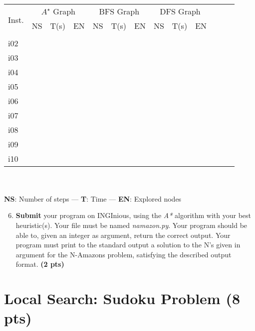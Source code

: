 \documentclass[11pt,a4paper]{report}
\begin{document}
~ 

\begin{answers}[6.5cm]
\begin{center}
\begin{tabular}{||l||l|l|l||l|l|l||l|l|l||l|l|l||}
\hline
\multirow{3}{*}{Inst.} & \multicolumn{3}{c||}{$A^{\star}$ Graph}& \multicolumn{3}{c||}{BFS Graph} & \multicolumn{3}{c||}{DFS Graph}\\
 & NS & T(s) & EN & NS & T(s) & EN & NS & T(s) & EN\\
\hline
i01 & & & & & & & & & \\
\hline
i02 & & & & & & & & & \\
\hline
i03 & & & & & & & & & \\
\hline
i04 & & & & & & & & & \\
\hline
i05 & & & & & & & & & \\
\hline
i06 & & & & & & & & & \\
\hline
i07 & & & & & & & & & \\
\hline
i08 & & & & & & & & & \\
\hline
i09 & & & & & & & & & \\
\hline
i10 & & & & & & & & & \\
\hline
\end{tabular}\\

~\\
\textbf{NS}: Number of steps — \textbf{T}: Time — \textbf{EN}: Explored nodes
\end{center}
\end{answers}



\begin{enumerate}
\setcounter{enumi}{5}
\item \textbf{Submit} your program on INGInious, using the \textit{A*} algorithm with your best heuristic(s).
		 Your file must be named \emph{namazon.py}. 
      Your program should be able to, given an integer as argument, return the correct output.
		 Your program must print to the standard output a solution to the N's given in argument for the N-Amazons problem, satisfying the described output format. \textbf{(2 pts)}
\end{enumerate}

\begin{answer}
\end{answer}

\section{Local Search: Sudoku Problem (8 pts)}
\end{document}
